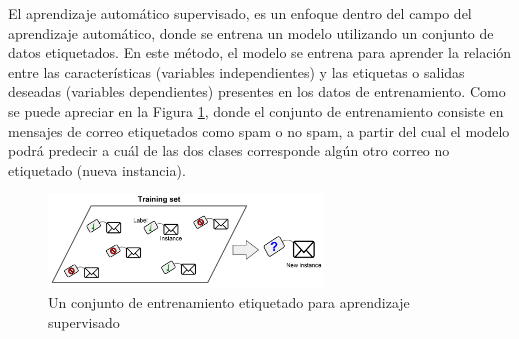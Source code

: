 El aprendizaje automático supervisado, es un enfoque dentro del campo del aprendizaje automático, donde se entrena un modelo utilizando un conjunto de datos etiquetados. En este método, el modelo se entrena para aprender la relación entre las características (variables independientes) y las etiquetas o salidas deseadas (variables dependientes) presentes en los datos de entrenamiento. Como se puede apreciar en la Figura \ref{fig:an8}, donde el conjunto de entrenamiento consiste en mensajes de correo etiquetados como spam o no spam, a partir del cual el modelo podrá predecir a cuál de las dos clases corresponde algún otro correo no etiquetado (nueva instancia). 

\begin{figure}
	\includegraphics[width=0.65\textwidth]{capitulo2/figuras/an8.png}
	\caption{Un conjunto de entrenamiento etiquetado para aprendizaje supervisado}
	\label{fig:an8}
\end{figure}